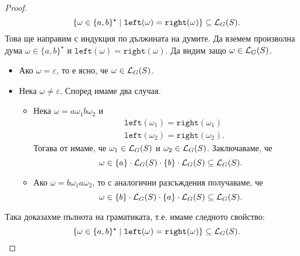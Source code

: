 \begin{proof}
\begin{equation}
    \{\omega \in \{a,b\}^\star \mid \texttt{left}(\omega) = \texttt{right}(\omega)\} \subseteq \mathcal{L}_G(S).
  \end{equation}
  Това ще направим с индукция по дължината на думите.
  Да вземем произволна дума $\omega \in \{a,b\}^\star$ и $\texttt{left}(\omega) = \texttt{right}(\omega)$.
  Да видим защо $\omega \in \mathcal{L}_G(S)$.
  \begin{itemize}
  \item 
    Ако $\omega = \varepsilon$, то е ясно, че $\omega \in \mathcal{L}_G(S)$.
  \item
    Нека $\omega \neq \varepsilon$. Според  имаме два случая.
    \begin{itemize}
    \item
      Нека $\omega = a \omega_1 b \omega_2$ и
      \begin{align*}
        & \texttt{left}(\omega_1) = \texttt{right}(\omega_1)\\
        & \texttt{left}(\omega_2) = \texttt{right}(\omega_2).
      \end{align*}
      Тогава от \IndHyp имаме, че $\omega_1 \in \mathcal{L}_G(S)$ и $\omega_2 \in \mathcal{L}_G(S)$. Заключаваме, че
      \[\omega \in \{a\} \cdot \mathcal{L}_G(S) \cdot \{b\} \cdot \mathcal{L}_G(S) \subseteq \mathcal{L}_G(S).\]
    \item
      Ако $\omega = b \omega_1 a \omega_2$, то с аналогични разсъждения получаваме, че
      \[\omega \in \{b\} \cdot \mathcal{L}_G(S) \cdot \{a\} \cdot \mathcal{L}_G(S) \subseteq \mathcal{L}_G(S).\]
    \end{itemize}
  \end{itemize}
  Така доказахме пълнота на граматиката, т.е. имаме следното свойство:
  \[\{\omega \in \{a,b\}^\star \mid \texttt{left}(\omega) = \texttt{right}(\omega)\} \subseteq \mathcal{L}_G(S).\]
\end{proof}

